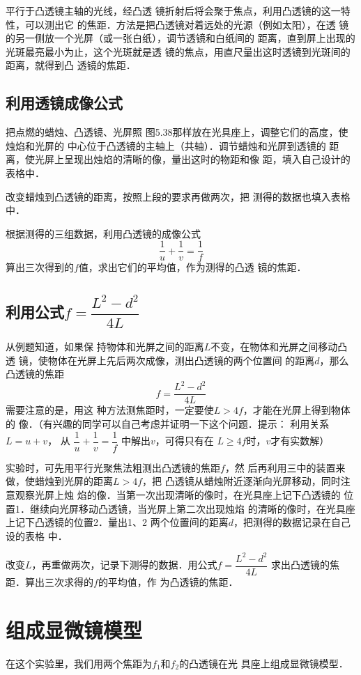 平行于凸透镜主轴的光线，经凸透
镜折射后将会聚于焦点，利用凸透镜的这一特性，可以测出它
的焦距．方法是把凸透镜对着远处的光源（例如太阳），在透
镜的另一侧放一个光屏（或一张白纸），调节透镜和白纸间的
距离，直到屏上出现的光斑最亮最小为止，这个光斑就是透
镜的焦点，用直尺量出这时透镜到光斑间的距离，就得到凸
透镜的焦距．

\subsection{利用透镜成像公式}

把点燃的蜡烛、凸透镜、光屏照
图5.38那样放在光具座上，调整它们的高度，使烛焰和光屏的
中心位于凸透镜的主轴上（共轴）．调节蜡烛和光屏到透镜的
距离，使光屏上呈现出烛焰的清晰的像，量出这时的物距和像
距，填入自己设计的表格中．

改变蜡烛到凸透镜的距离，按照上段的要求再做两次，把
测得的数据也填入表格中．

根据测得的三组数据，利用凸透镜的成像公式
\[\frac{1}{u}+\frac{1}{v}=\frac{1}{f} \]
算出三次得到的$f$值，求出它们的平均值，作为测得的凸透
镜的焦距．

\subsection{利用公式$f=\dfrac{L^2-d^2}{4L}$}

从例题知道，如果保
持物体和光屏之间的距离$L$不变，在物体和光屏之间移动凸透
镜，使物体在光屏上先后两次成像，测出凸透镜的两个位置间
的距离$d$，那么凸透镜的焦距
\[f=\dfrac{L^2-d^2}{4L} \]
需要注意的是，用这
种方法测焦距时，一定要使$L>4f$，才能在光屏上得到物体的
像．（有兴趣的同学可以自己考虑并证明一下这个问题．提示：
利用关系$L=u+v$，
从
$\dfrac{1}{u}+\dfrac{1}{v}=\dfrac{1}{f} $
中解出$v$，可得只有在
$L\ge 4f$时，$v$才有实数解）

实验时，可先用平行光聚焦法粗测出凸透镜的焦距$f$，然
后再利用三中的装置来做，使蜡烛到光屏的距离$L>4f$，把
凸透镜从蜡烛附近逐渐向光屏移动，同时注意观察光屏上烛
焰的像．当第一次出现清晰的像时，在光具座上记下凸透镜的
位置1．继续向光屏移动凸透镜，当光屏上第二次出现烛焰
的清晰的像时，在光具座上记下凸透镜的位置2．量出1、2
两个位置间的距离$d$，把测得的数据记录在自己设的表格
中．

改变$L$，再重做两次，记录下测得的数据．用公式$f=\dfrac{L^2-d^2}{4L}$
求出凸透镜的焦距．算出三次求得的$f$的平均值，作
为凸透镜的焦距．

\section{组成显微镜模型}
在这个实验里，我们用两个焦距为$f_1$和$f_2$的凸透镜在光
具座上组成显微镜模型．

